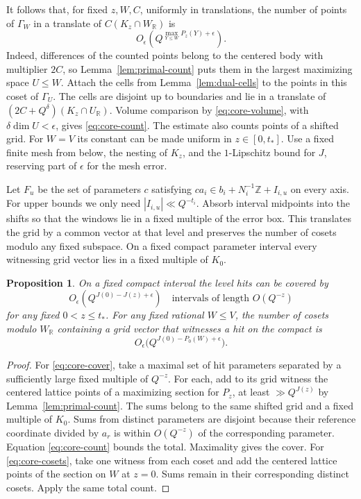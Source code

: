 \documentclass[11pt,reqno,a4paper]{amsart}
\newtheorem{proposition}[theorem]{Proposition}
\theoremstyle{remark}
\numberwithin{equation}{section}
\begin{document}
It follows that, for fixed $z,W,C$, uniformly in translations, the
number of points of $\Gamma_W$ in a translate of $C(K_z\cap W_{\mathbb R})$
is
\begin{equation}\label{eq:core-count}
 O_\epsilon\left(Q^{\max_{Y\le W}P_z(Y)+\epsilon}\right).
\end{equation}
Indeed, differences of the counted points belong to the centered
body with multiplier $2C$, so Lemma~\ref{lem:primal-count} puts
them in the largest maximizing space $U\le W$. Attach the cells
from Lemma~\ref{lem:dual-cells} to the points in this coset of
$\Gamma_U$. The cells are disjoint up to boundaries and lie in a
translate of $(2C+Q^\delta)(K_z\cap U_{\mathbb R})$. Volume comparison
by \eqref{eq:core-volume}, with $\delta\dim U<\epsilon$, gives
\eqref{eq:core-count}. The estimate also counts points of a shifted
grid. For $W=V$ its constant can be made uniform in $z\in[0,t_*]$.
Use a fixed finite mesh from below, the nesting of $K_z$, and the
$1$-Lipschitz bound for $J$, reserving part of $\epsilon$ for the
mesh error.

Let $F_u$ be the set of parameters $c$ satisfying
$c a_i\in b_i+N_i^{-1}\mathbb Z+I_{i,u}$ on every axis. For upper
bounds we only need $|I_{i,u}|\ll Q^{-t_i}$. Absorb interval
midpoints into the shifts so that the windows lie in a fixed
multiple of the error box. This translates the grid by a common
vector at that level and preserves the number of cosets modulo
any fixed subspace. On a fixed compact parameter interval every
witnessing grid vector lies in a fixed multiple of $K_0$.

\begin{proposition}\label{prop:translated-covers}
On a fixed compact interval the level hits can be covered by
\begin{equation}\label{eq:core-cover}
 O_\epsilon(Q^{J(0)-J(z)+\epsilon})
 \quad\text{intervals of length }O(Q^{-z})
\end{equation}
for any fixed $0<z\le t_*$. For any fixed rational $W\le V$, the
number of cosets modulo $W_{\mathbb R}$ containing a grid vector
that witnesses a hit on the compact is
\begin{equation}\label{eq:core-cosets}
 O_\epsilon\bigl(Q^{J(0)-P_0(W)+\epsilon}\bigr).
\end{equation}
\end{proposition}

\begin{proof}
For \eqref{eq:core-cover}, take a maximal set of hit parameters
separated by a sufficiently large fixed multiple of $Q^{-z}$.
For each, add to its grid witness the centered lattice points of
a maximizing section for $P_z$, at least $\gg Q^{J(z)}$ by
Lemma~\ref{lem:primal-count}. The sums belong to the same shifted
grid and a fixed multiple of $K_0$. Sums from distinct parameters
are disjoint because their reference coordinate divided by $a_r$
is within $O(Q^{-z})$ of the corresponding parameter. Equation
\eqref{eq:core-count} bounds the total. Maximality gives the
cover. For \eqref{eq:core-cosets}, take one witness from each
coset and add the centered lattice points of the section on $W$
at $z=0$. Sums remain in their corresponding distinct cosets.
Apply the same total count.
\end{proof}
\end{document}
